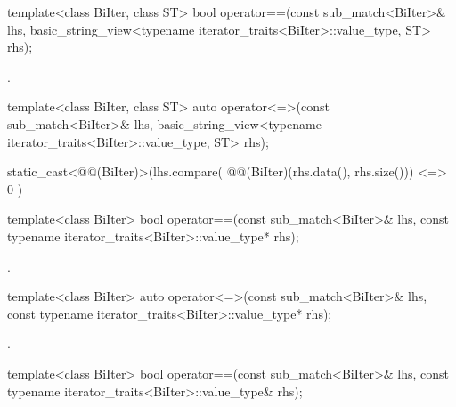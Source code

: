 %
\begin{itemdecl}
template<class BiIter, class ST>
  bool operator==(const sub_match<BiIter>& lhs,
                  basic_string_view<typename iterator_traits<BiIter>::value_type, ST> rhs);
\end{itemdecl}

\begin{itemdescr}
\pnum
\returns
{}.
\end{itemdescr}

%
\begin{itemdecl}
template<class BiIter, class ST>
  auto operator<=>(const sub_match<BiIter>& lhs,
                   basic_string_view<typename iterator_traits<BiIter>::value_type, ST> rhs);
\end{itemdecl}

\begin{itemdescr}
\pnum
\returns
\begin{codeblock}
static_cast<@@(BiIter)>(lhs.compare(
  @@(BiIter)(rhs.data(), rhs.size()))
    <=> 0
  )
\end{codeblock}
\end{itemdescr}

%
\begin{itemdecl}
template<class BiIter>
  bool operator==(const sub_match<BiIter>& lhs,
                  const typename iterator_traits<BiIter>::value_type* rhs);
\end{itemdecl}

\begin{itemdescr}
\pnum
\returns
{}.
\end{itemdescr}

%
\begin{itemdecl}
template<class BiIter>
  auto operator<=>(const sub_match<BiIter>& lhs,
                   const typename iterator_traits<BiIter>::value_type* rhs);
\end{itemdecl}

\begin{itemdescr}
\pnum
\returns
{}.
\end{itemdescr}

%
\begin{itemdecl}
template<class BiIter>
  bool operator==(const sub_match<BiIter>& lhs,
                  const typename iterator_traits<BiIter>::value_type& rhs);
\end{itemdecl}

